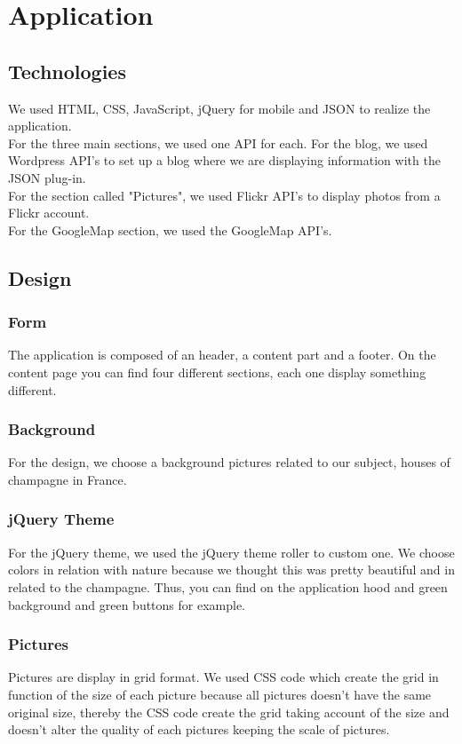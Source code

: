 \documentclass[12pt]{report}%
\begin{document}
\tableofcontents
\clearpage


\chapter{Application}
\section{Technologies}
We used HTML, CSS, JavaScript, jQuery for mobile and JSON to realize the application.\\
For the three main sections, we used one API for each. For the blog, we used Wordpress API's to set up a blog where we are displaying information with the JSON plug-in.\\
For the section called "Pictures", we used Flickr API's to display photos from a Flickr account.\\
For the GoogleMap section, we used the GoogleMap API's.
\section{Design}
\subsection{Form}
The application is composed of an header, a content part and a footer. On the content page you can find four different sections, each one display something different.
\subsection{Background}
For the design, we choose a background pictures related to our subject, houses of champagne in France.\\
\subsection{jQuery Theme}
For the jQuery theme, we used the jQuery theme roller to custom one. We choose colors in relation with nature because we thought this was pretty beautiful and in related to the champagne. Thus, you can find on the application hood and green background and green buttons for example.
\subsection{Pictures}
Pictures are display in grid format. We used CSS code which create the grid in function of the size of each picture because all pictures doesn't have the same original size, thereby the CSS code create the grid taking account of the size and doesn't alter the quality of each pictures keeping the scale of pictures.
\end{document}
